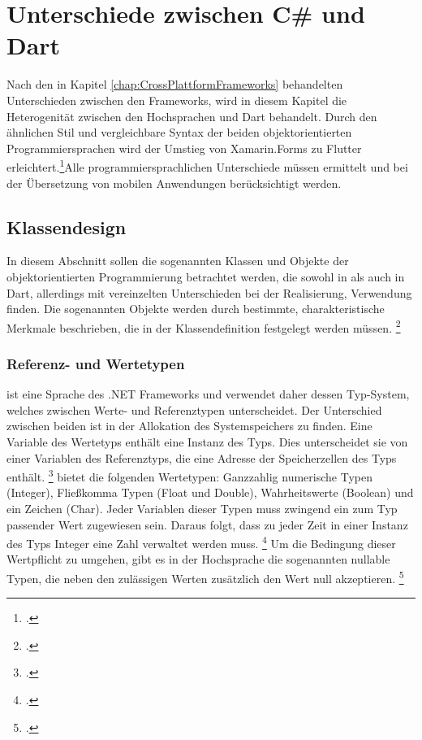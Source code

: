 \chapter{Unterschiede zwischen C\# und Dart}
\label{chap:Programmiersprachen}

Nach den in Kapitel \ref{chap:CrossPlattformFrameworks} behandelten Unterschieden zwischen den Frameworks, wird in diesem Kapitel die Heterogenität zwischen den Hochsprachen \Csharp{} und Dart behandelt.  Durch den ähnlichen Stil und vergleichbare Syntax der beiden objektorientierten Programmiersprachen wird der Umstieg von Xamarin.Forms zu Flutter erleichtert.\footcite[Vgl. ][Abgerufen am \today]{Pedley2019}Alle programmiersprachlichen Unterschiede müssen ermittelt und bei der Übersetzung von mobilen Anwendungen berücksichtigt werden.

\section{Klassendesign}
In diesem Abschnitt sollen die sogenannten Klassen und Objekte der objektorientierten Programmierung betrachtet werden, die sowohl in \Csharp{} als auch in Dart, allerdings mit vereinzelten Unterschieden bei der Realisierung, Verwendung finden. Die sogenannten Objekte werden durch bestimmte,  charakteristische Merkmale beschrieben,  die in der Klassendefinition festgelegt werden müssen. \footcite[Vgl.][S. 11f.]{Witte2013}

\subsection{Referenz- und Wertetypen}
\Csharp{} ist eine Sprache des \glq .NET Frameworks\grq{} und verwendet daher dessen Typ-System,  welches zwischen Werte- und Referenztypen unterscheidet.  Der Unterschied zwischen beiden ist in der Allokation des Systemspeichers zu finden.  Eine Variable des Wertetyps enthält eine Instanz des Typs.  Dies unterscheidet sie von einer Variablen des Referenztyps,  die eine Adresse der Speicherzellen des Typs enthält. \footcite[Vgl.][S. 155f.]{Kühnel2019} \Csharp{} bietet die folgenden Wertetypen: Ganzzahlig numerische Typen (Integer),  Fließkomma  Typen (Float und Double),  Wahrheitswerte (Boolean) und ein Zeichen (Char).  Jeder Variablen dieser Typen muss zwingend ein zum Typ passender Wert zugewiesen sein.  Daraus folgt,  dass zu jeder Zeit in einer Instanz des Typs Integer eine Zahl verwaltet werden muss. \footcite[Vgl. ][Abgerufen am \today]{MicrosoftValueTypes2020} Um die Bedingung dieser Wertpflicht zu umgehen,  gibt es in der Hochsprache \Csharp{} die sogenannten \glq nullable\grq{} Typen,  die neben den zulässigen Werten zusätzlich den Wert \glq null\grq{} akzeptieren. \footcite[Vgl.][S. 167]{Bayer2008} 

